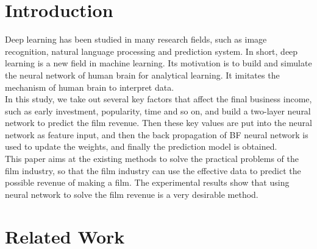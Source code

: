 \section{Introduction}
\label{sec-intro}

Deep learning has been studied in many research fields, such as image recognition, natural language processing and prediction system. In short, deep learning is a new field in machine learning. Its motivation is to build and simulate the neural network of human brain for analytical learning. It imitates the mechanism of human brain to interpret data.\\

In this study, we take out several key factors that affect the final business income, such as early investment, popularity, time and so on, and build a two-layer neural network to predict the film revenue. Then these key values are put into the neural network as feature input, and then the back propagation of BF neural network is used to update the weights, and finally the prediction model is obtained.\\
   
This paper aims at the existing methods to solve the practical problems of the film industry, so that the film industry can use the effective data to predict the possible revenue of making a film. The experimental results show that using neural network to solve the film revenue is a very desirable method.\\























\section{Related Work} \label{sec-preliminaries}

